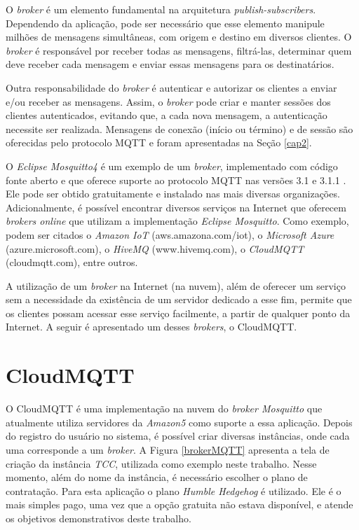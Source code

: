 \documentclass[
12pt,
openany, %
oneside, %
a4paper,			
english,			
brazil			        %
]{abntbibufjf}
\begin{document}
    O \textit{broker} é um elemento fundamental na arquitetura \textit{publish-subscribers}. Dependendo da aplicação, pode ser necessário que esse elemento manipule milhões de mensagens simultâneas, com origem e destino em diversos clientes. O \textit{broker} é responsável por receber todas as mensagens, filtrá-las, determinar quem deve receber cada mensagem e enviar essas mensagens para os destinatários.
    
    Outra responsabilidade do \textit{broker} é autenticar e autorizar os clientes a enviar e/ou receber as mensagens. Assim, o \textit{broker} pode criar e manter sessões dos clientes autenticados, evitando que, a cada nova mensagem, a autenticação necessite ser realizada. Mensagens de conexão (início ou término) e de sessão são oferecidas pelo protocolo MQTT e foram apresentadas na Seção \ref{cap2}.
    
    O \textit{Eclipse Mosquitto4} é um exemplo de um \textit{broker}, implementado com código fonte aberto e que oferece suporte ao protocolo MQTT nas versões 3.1 e 3.1.1 \cite{OASIS}. Ele pode ser obtido gratuitamente e instalado nas mais diversas organizações. Adicionalmente, é possível encontrar diversos serviços na Internet que oferecem \textit{brokers online} que utilizam a implementação \textit{Eclipse Mosquitto}. Como exemplo, podem ser citados o \textit{Amazon IoT} (aws.amazona.com/iot), o \textit{Microsoft Azure} (azure.microsoft.com), o \textit{HiveMQ} (www.hivemq.com), o \textit{CloudMQTT} (cloudmqtt.com), entre outros.
    
    A utilização de um \textit{broker} na Internet (na nuvem), além de oferecer um serviço sem a necessidade da existência de um servidor dedicado a esse fim, permite que os clientes possam acessar esse serviço facilmente, a partir de qualquer ponto da Internet. A seguir é apresentado um desses \textit{brokers}, o CloudMQTT.
	
    
    \section{CloudMQTT}
    
    O CloudMQTT é uma implementação na nuvem do \textit{broker Mosquitto} que atualmente utiliza servidores da \textit{Amazon5} como suporte a essa aplicação. Depois do registro do usuário no sistema, é possível criar diversas instâncias, onde cada uma corresponde a um \textit{broker}. A Figura \ref{brokerMQTT} apresenta a tela de criação da instância \textit{TCC}, utilizada como exemplo neste trabalho. Nesse momento, além do nome da instância, é necessário escolher o plano de contratação. Para esta aplicação o plano \textit{Humble Hedgehog} é utilizado. Ele é o mais simples pago, uma vez que a opção gratuita não estava disponível, e atende os objetivos demonstrativos deste trabalho.
	
\end{document}
